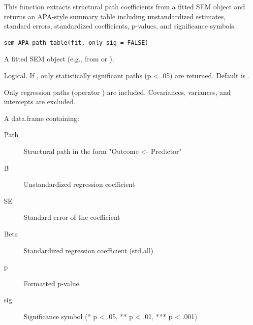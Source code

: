 \documentclass[a4paper]{book}
\begin{document}
%
\begin{Description}
This function extracts structural path coefficients from a fitted
 SEM object and returns an APA-style summary table
including unstandardized estimates, standard errors, standardized
coefficients, p-values, and significance symbols.
\end{Description}
%
\begin{Usage}
\begin{verbatim}
sem_APA_path_table(fit, only_sig = FALSE)
\end{verbatim}
\end{Usage}
%
\begin{Arguments}
\begin{ldescription}
\item[\code{fit}] A fitted  SEM object (e.g., from  or ).

\item[\code{only\_sig}] Logical. If , only statistically significant
paths (p < .05) are returned. Default is .
\end{ldescription}
\end{Arguments}
%
\begin{Details}
Only regression paths (operator ) are included.
Covariances, variances, and intercepts are excluded.
\end{Details}
%
\begin{Value}
A data.frame containing:
\begin{description}

\item[Path] Structural path in the form "Outcome <- Predictor"
\item[B] Unstandardized regression coefficient
\item[SE] Standard error of the coefficient
\item[Beta] Standardized regression coefficient (std.all)
\item[p] Formatted p-value
\item[sig] Significance symbol (* p < .05, ** p < .01, *** p < .001)

\end{description}

\end{Value}
%
\end{document}
